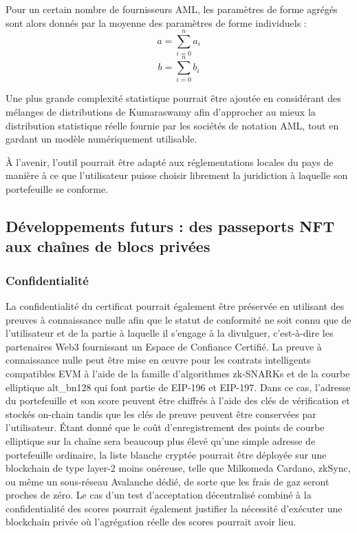 ﻿\documentclass[a4paper]{article}
\begin{document}
Pour un certain nombre de fournisseurs AML, les paramètres de forme agrégés sont alors donnés par la moyenne des paramètres de forme individuels :
$$a=\sum_{i=0}^na_i$$
$$b=\sum_{i=0}^nb_i$$  

Une plus grande complexité statistique pourrait être ajoutée en considérant des mélanges de distributions de Kumaraswamy afin d'approcher au mieux la distribution statistique réelle fournie par les sociétés de notation AML, tout en gardant un modèle numériquement utilisable.

À l'avenir, l'outil pourrait être adapté aux réglementations locales du pays de manière à ce que l'utilisateur puisse choisir librement la juridiction à laquelle son portefeuille se conforme.

\subsection{Développements futurs : des passeports NFT aux chaînes de blocs privées}
\subsubsection{Confidentialité}
La confidentialité du certificat pourrait également être préservée en utilisant des preuves à connaissance nulle afin que le statut de conformité ne soit connu que de l'utilisateur et de la partie à laquelle il s'engage à la divulguer, c'est-à-dire les partenaires Web3 fournissant un Espace de Confiance Certifié. La preuve à connaissance nulle peut être mise en œuvre pour les contrats intelligents compatibles EVM à l'aide de la famille d'algorithmes zk-SNARKs et de la courbe elliptique alt\_bn128 qui font partie de EIP-196 et EIP-197. Dans ce cas, l'adresse du portefeuille et son score peuvent être chiffrés à l’aide des clés de vérification et stockés on-chain tandis que les clés de preuve peuvent être conservées par l'utilisateur.
Étant donné que le coût d'enregistrement des points de courbe elliptique sur la chaîne sera beaucoup plus élevé qu'une simple adresse de portefeuille ordinaire, la liste blanche cryptée pourrait être déployée sur une blockchain de type layer-2 moins onéreuse, telle que Milkomeda Cardano, zkSync, ou même un sous-réseau Avalanche dédié, de sorte que les frais de gaz seront proches de zéro.
Le cas d'un test d'acceptation décentralisé combiné à la confidentialité des scores pourrait également justifier la nécessité d'exécuter une blockchain privée où l'agrégation réelle des scores pourrait avoir lieu.
\end{document}
